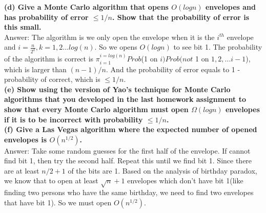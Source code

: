 \documentclass{article}
\begin{document}
\textbf{(d) Give a Monte Carlo algorithm that opens $O(logn)$ envelopes and has probability of error $\leq 1/n$. Show that the probability of error is this small.} \\ \newline
Answer: The algorithm is we only open the envelope when it is the $i^{th}$ envelope and $i = \frac{n}{2^k}, k = 1, 2 ... log(n)$. So we opens $O(logn)$ to see bit 1. The probability of the algorithm is correct is $\pi_{i=1}^{i=log(n)}Prob$(1 on $i)Prob(not$ 1 on $1, 2, ... i-1$), which is larger than $(n-1)/n$. And the probability of error equals to 1 - probability of correct, which is $\leq 1/n$. \\\newline
\textbf{(e) Show using the version of Yao’s technique for Monte Carlo algorithms that you developed in the last homework assignment to show that every Monte Carlo algorithm must open $\Omega(logn)$ envelopes if it is to be incorrect with probability $\leq 1/n$.} \\ \newline
\textbf{(f) Give a Las Vegas algorithm where the expected number of opened envelopes is $O(n^{1/2})$.}\\ \newline
Answer: Take some random guesses for the first half of the envelope. If cannot find bit 1, then try the second half. Repeat this until we find bit 1. Since there are at least $n/2 + 1$ of the bits are 1. Based on the analysis of birthday paradox, we know that to open at least $\sqrt{n} + 1$ envelopes which don't have bit 1(like finding two persons who have the same birthday, we need to find two envelopes that have bit 1). So we must open  $O(n^{1/2})$.
\end{document}
